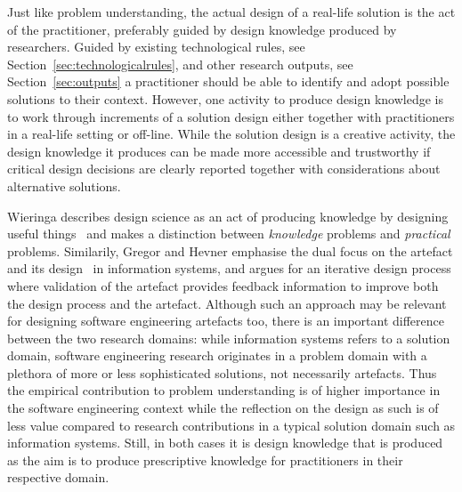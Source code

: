 \documentclass[graybox]{svmult}
\begin{document}
Just like problem understanding, the actual design of a real-life solution is the act of the practitioner, preferably guided by design knowledge produced by researchers. %
Guided by existing technological rules, see Section~\ref{sec:technologicalrules}, and other research outputs, see Section~\ref{sec:outputs} a practitioner should be able to identify and adopt possible solutions to their context. However, one activity to produce design knowledge is to work through increments of a solution design either together with practitioners in a real-life setting or off-line. %
While the solution design is a creative activity, the design knowledge it produces can be made more accessible and trustworthy if critical design decisions are clearly reported together with considerations about alternative solutions.





Wieringa describes design science as an act of producing knowledge by designing useful things~\cite{wieringa_design_2009} and makes a distinction between \emph{knowledge} problems and \emph{practical} problems. Similarily, Gregor and Hevner emphasise the dual focus on the artefact and its design~\cite{gregor_positioning_2013} in information systems, and argues for an iterative design process where validation of the artefact provides feedback information to improve both the design process and the artefact. Although such an approach may be relevant for designing software engineering artefacts too, there is an important difference between the two research domains: while information systems refers to a solution domain, software engineering research originates in a problem domain with a plethora of more or less sophisticated solutions, not necessarily artefacts. Thus the empirical contribution to problem understanding is of higher importance in the software engineering context while the reflection on the design as such is of less value compared to research contributions in a typical solution domain such as information systems. Still, in both cases it is design knowledge that is produced as the aim is to produce prescriptive knowledge for practitioners in their respective domain. 

 
\end{document}
